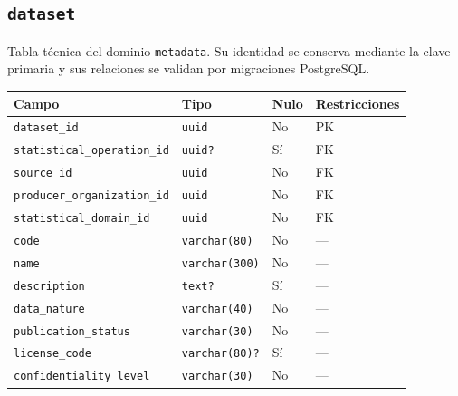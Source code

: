 \documentclass[11pt]{article}
\begin{document}
\subsection{\texttt{dataset}}
Tabla técnica del dominio \texttt{metadata}. Su identidad se conserva mediante la clave primaria y sus relaciones se validan por migraciones PostgreSQL.
\begin{longtable}{>{\raggedright\arraybackslash}p{} p{} p{} p{}}
\toprule Campo & Tipo & Nulo & Restricciones \\ \midrule\endhead
\texttt{dataset\_id} & \texttt{uuid} & No & PK \\
\texttt{statistical\_operation\_id} & \texttt{uuid?} & Sí & FK \\
\texttt{source\_id} & \texttt{uuid} & No & FK \\
\texttt{producer\_organization\_id} & \texttt{uuid} & No & FK \\
\texttt{statistical\_domain\_id} & \texttt{uuid} & No & FK \\
\texttt{code} & \texttt{varchar(80)} & No & --- \\
\texttt{name} & \texttt{varchar(300)} & No & --- \\
\texttt{description} & \texttt{text?} & Sí & --- \\
\texttt{data\_nature} & \texttt{varchar(40)} & No & --- \\
\texttt{publication\_status} & \texttt{varchar(30)} & No & --- \\
\texttt{license\_code} & \texttt{varchar(80)?} & Sí & --- \\
\texttt{confidentiality\_level} & \texttt{varchar(30)} & No & --- \\
\bottomrule\end{longtable}
\end{document}
